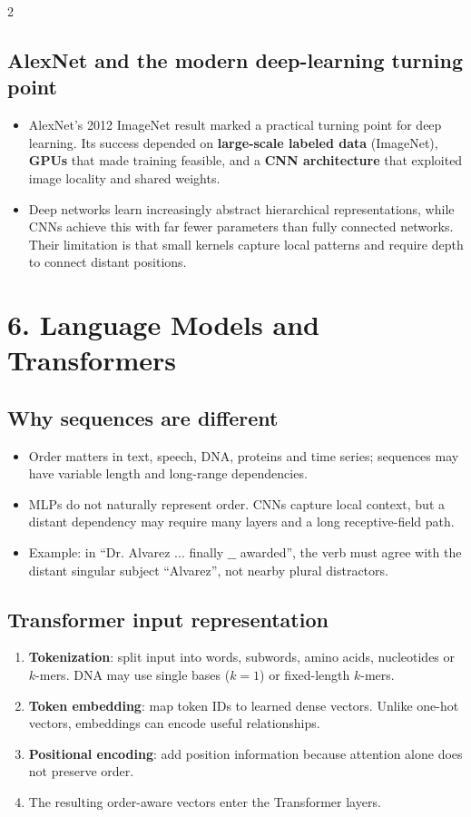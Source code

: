 \documentclass[10pt,a4paper]{ctexart}
\newcommand{\key}[1]{\textbf{#1}}
\begin{document}
\begin{multicols*}{2}
\subsection{AlexNet and the modern deep-learning turning point}
\begin{itemize}
  \item AlexNet's 2012 ImageNet result marked a practical turning point for deep learning. Its success depended
  on \key{large-scale labeled data} (ImageNet), \key{GPUs} that made training feasible, and a
  \key{CNN architecture} that exploited image locality and shared weights.
  \item Deep networks learn increasingly abstract hierarchical representations, while CNNs achieve this
  with far fewer parameters than fully connected networks. Their limitation is that small kernels
  capture local patterns and require depth to connect distant positions.
\end{itemize}


\section{6. Language Models and Transformers}
\subsection{Why sequences are different}
\begin{itemize}
  \item Order matters in text, speech, DNA, proteins and time series; sequences may have variable length and long-range dependencies.
  \item MLPs do not naturally represent order. CNNs capture local context, but a distant dependency may require many layers and a long receptive-field path.
  \item Example: in ``Dr. Alvarez ... finally \(\_\_\) awarded'', the verb must agree with the distant singular subject ``Alvarez'', not nearby plural distractors.
\end{itemize}

\subsection{Transformer input representation}
\begin{enumerate}
  \item \key{Tokenization}: split input into words, subwords, amino acids, nucleotides or \(k\)-mers. DNA may use single bases (\(k=1\)) or fixed-length \(k\)-mers.
  \item \key{Token embedding}: map token IDs to learned dense vectors. Unlike one-hot vectors, embeddings can encode useful relationships.
  \item \key{Positional encoding}: add position information because attention alone does not preserve order.
  \item The resulting order-aware vectors enter the Transformer layers.
\end{enumerate}


\end{multicols*}
\end{document}
